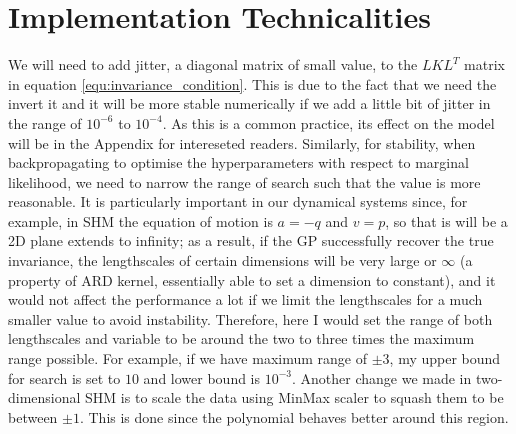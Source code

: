 \documentclass{statsmsc}
\begin{document}
\section{Implementation Technicalities}
We will need to add jitter, a diagonal matrix of small value, to the $LKL^T$ matrix in equation \ref{equ:invariance_condition}.
This is due to the fact that we need the invert it and it will be more stable numerically if we add a little bit of jitter in the range of $10^{-6}$ to $10^{-4}$.
As this is a common practice, its effect on the model will be in the Appendix for intereseted readers.
Similarly, for stability, when backpropagating to optimise the hyperparameters with respect to marginal likelihood, we need to narrow the range of search such that the value is more reasonable.
It is particularly important in our dynamical systems since, for example, in SHM the equation of motion is $a=-q$ and $v=p$, so that is will be a 2D plane extends to infinity;
as a result, if the GP successfully recover the true invariance, the lengthscales of certain dimensions will be very large or $\infty$ (a property of ARD kernel, essentially able to set a dimension to constant), and it would not affect the performance a lot if we limit the lengthscales for a much smaller value to avoid instability.
Therefore, here I would set the range of both lengthscales and variable to be around the two to three times the maximum range possible.
For example, if we have maximum range of $\pm 3$, my upper bound for search is set to $10$ and lower bound is $10^{-3}$.
Another change we made in two-dimensional SHM is to scale the data using MinMax scaler to squash them to be between $\pm 1$. 
This is done since the polynomial behaves better around this region.
\end{document}
